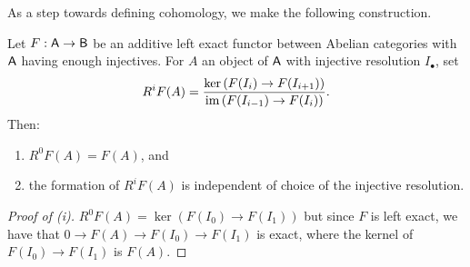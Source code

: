 As a step towards defining cohomology, we make the following construction. 
\begin{proposition}\label{prop: derived functor of additive left exact functor}
    Let $F:\mathsf{A}\to\mathsf{B}$ be an additive left exact functor between Abelian categories with $\mathsf{A}$ having enough injectives. For $A$ an object of $\mathsf{A}$ with injective resolution $I_{\bullet}$, set 
    $$R^{i}F(A)=\frac{\ker\left(F(I_{i})\to F(I_{i+1})\right)}{\mathrm{im}\left(F(I_{i-1})\to F(I_{i})\right)}.$$
    Then:
    \begin{enumerate}[label=(\roman*)]
        \item $R^{0}F(A)=F(A)$, and 
        \item the formation of $R^{i}F(A)$ is independent of choice of the injective resolution. 
    \end{enumerate}
\end{proposition}
\begin{proof}[Proof of (i)]
    $R^{0}F(A)=\ker(F(I_{0})\to F(I_{1}))$ but since $F$ is left exact, we have that $0\to F(A)\to F(I_{0})\to F(I_{1})$ is exact, where the kernel of $F(I_{0})\to F(I_{1})$ is $F(A)$. 
\end{proof}
